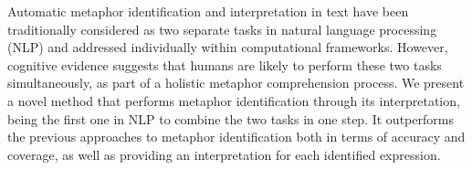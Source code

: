 Automatic metaphor identification and interpretation in text have been traditionally considered as two separate tasks in natural language processing
 (NLP) and addressed individually within computational frameworks. However,
 cognitive evidence suggests that humans are likely to perform these two tasks
 simultaneously, as part of a holistic metaphor comprehension process. We
 present a novel method that performs metaphor identification through its
 interpretation, being the first one in NLP to combine the two tasks in one
 step. It outperforms the previous approaches to metaphor identification both in
 terms of accuracy and coverage, as well as providing an interpretation for each
 identified expression.

